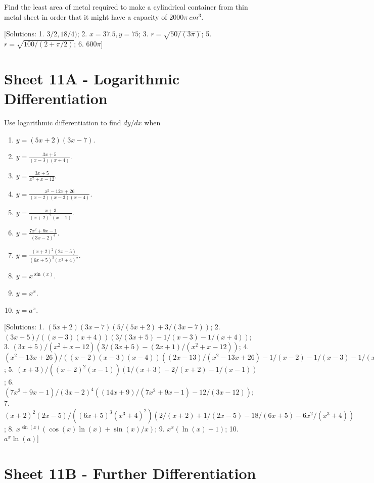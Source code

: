 \documentclass[
  english,
  11pt,
  oneside]{book}
\providecommand{\tightlist}{%
  \setlength{\itemsep}{0pt}\setlength{\parskip}{0pt}}
\newcommand{\slide}{}
\theoremstyle{definition}
\theoremstyle{definition}
\theoremstyle{definition}
\theoremstyle{definition}
\theoremstyle{remark}
\begin{document}
Find the least area of metal required to make a cylindrical container from thin metal sheet in order that it might have a capacity of \(2000\pi\ cm^3\).

{[}Solutions: 1. \(3/2,18/4)\); 2. \(x=37.5, y = 75\); 3. \(r=\sqrt{50/(3\pi)}\); 5. \(r=\sqrt{100/(2+\pi/2)}\); 6. \(600\pi\){]}
\slide

\section{Sheet 11A - Logarithmic Differentiation}\label{sheet-11a---logarithmic-differentiation}

Use logarithmic differentiation to find \(dy/dx\) when

\begin{enumerate}
\def\labelenumi{\arabic{enumi}.}
\tightlist
\item
  \(y = (5x+2)(3x-7)\).
\item
  \(y = \frac{3x+5}{(x-3)(x+4)}\).
\item
  \(y = \frac{3x+5}{x^2+x-12}\).
\item
  \(y = \frac{x^2-12x+26}{(x-2)(x-3)(x-4)}\).
\item
  \(y = \frac{x+3}{(x+2)^2(x-1)}\).
\item
  \(y = \frac{7x^2+9x-1}{(3x-2)^4}\).
\item
  \(y = \frac{(x+2)^2(2x-5)}{(6x+5)^3(x^3+4)^2}\).
\item
  \(y = x^{\sin(x)}\).
\item
  \(y = x^x\).
\item
  \(y = a^x\).
\end{enumerate}

{[}Solutions: 1. \((5x+2)(3x-7)\left(5/(5x+2)+3/(3x-7)\right)\); 2. \((3x+5)/((x-3)(x+4))\left(3/(3x+5)-1/(x-3)-1/(x+4)\right)\); 3. \((3x+5)/(x^2+x-12)\left(3/(3x+5)-(2x+1)/(x^2+x-12)\right)\); 4. \((x^2-13x+26)/((x-2)(x-3)(x-4))\left((2x-13)/(x^2-13x+26)-1/(x-2)-1/(x-3)-1/(x-4)\right)\); 5. \((x+3)/((x+2)^2(x-1))\left(1/(x+3)-2/(x+2)-1/(x-1)\right)\); 6. \((7x^2+9x-1)/(3x-2)^4\left((14x+9)/(7x^2+9x-1)-12/(3x-12)\right)\); 7. \((x+2)^2(2x-5)/((6x+5)^3(x^3+4)^2)\left(2/(x+2)+1/(2x-5)-18/(6x+5)-6x^2/(x^3+4)\right)\); 8. \(x^{\sin(x)}\left(\cos(x)\ln(x)+\sin(x)/x\right)\); 9. \(x^x(\ln(x)+1)\); 10. \(a^x\ln(a)\){]}

\section{Sheet 11B - Further Differentiation}\label{sheet-11b---further-differentiation}
\end{document}
